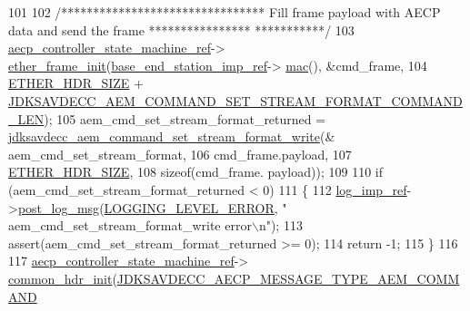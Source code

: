 \begin{DoxyCode}
101 
102     \textcolor{comment}{/******************************** Fill frame payload with AECP data and send the frame ****************
      ***********/}
103     \hyperlink{namespaceavdecc__lib_a0b1b5aea3c0490f77cbfd9178af5be22}{aecp\_controller\_state\_machine\_ref}->
      \hyperlink{classavdecc__lib_1_1aecp__controller__state__machine_a86ff947c5e6b799cfb877d3767bfa1f9}{ether\_frame\_init}(\hyperlink{classavdecc__lib_1_1descriptor__base__imp_a550c969411f5f3b69f55cc139763d224}{base\_end\_station\_imp\_ref}->
      \hyperlink{classavdecc__lib_1_1end__station__imp_a08e1bd1861b3b8f447ea374a65ac11f9}{mac}(), &cmd\_frame,
104                                                         \hyperlink{namespaceavdecc__lib_a6c827b1a0d973e18119c5e3da518e65ca9512ad9b34302ba7048d88197e0a2dc0}{ETHER\_HDR\_SIZE} + 
      \hyperlink{group__command__set__stream__format_ga54f70043611f17ce7ca3c27c68a02fa6}{JDKSAVDECC\_AEM\_COMMAND\_SET\_STREAM\_FORMAT\_COMMAND\_LEN});
105     aem\_cmd\_set\_stream\_format\_returned = 
      \hyperlink{group__command__set__stream__format_ga52683ffa93eb5b180190041f82194ca9}{jdksavdecc\_aem\_command\_set\_stream\_format\_write}(&
      aem\_cmd\_set\_stream\_format,
106                                                                                         cmd\_frame.payload,
107                                                                                         
      \hyperlink{namespaceavdecc__lib_a6c827b1a0d973e18119c5e3da518e65ca9512ad9b34302ba7048d88197e0a2dc0}{ETHER\_HDR\_SIZE},
108                                                                                         \textcolor{keyword}{sizeof}(cmd\_frame.
      payload));
109 
110     \textcolor{keywordflow}{if} (aem\_cmd\_set\_stream\_format\_returned < 0)
111     \{
112         \hyperlink{namespaceavdecc__lib_acbe3e2a96ae6524943ca532c87a28529}{log\_imp\_ref}->\hyperlink{classavdecc__lib_1_1log_a68139a6297697e4ccebf36ccfd02e44a}{post\_log\_msg}(\hyperlink{namespaceavdecc__lib_a501055c431e6872ef46f252ad13f85cdaf2c4481208273451a6f5c7bb9770ec8a}{LOGGING\_LEVEL\_ERROR}, \textcolor{stringliteral}{"
      aem\_cmd\_set\_stream\_format\_write error\(\backslash\)n"});
113         assert(aem\_cmd\_set\_stream\_format\_returned >= 0);
114         \textcolor{keywordflow}{return} -1;
115     \}
116 
117     \hyperlink{namespaceavdecc__lib_a0b1b5aea3c0490f77cbfd9178af5be22}{aecp\_controller\_state\_machine\_ref}->
      \hyperlink{classavdecc__lib_1_1aecp__controller__state__machine_aafc737d7ed17a62fed9df6528f18d3ec}{common\_hdr\_init}(\hyperlink{group__aecp__message__type_ga4625ce189cc209f42deb0629f48faf69}{JDKSAVDECC\_AECP\_MESSAGE\_TYPE\_AEM\_COMMAND}

\end{DoxyCode}
